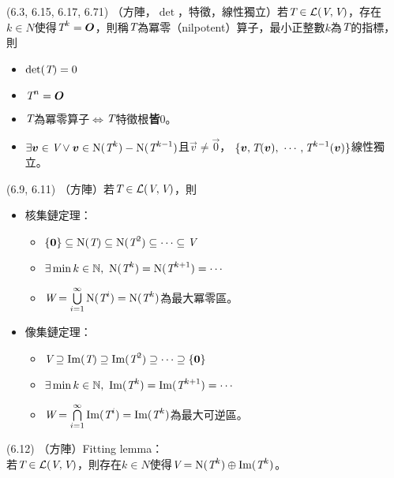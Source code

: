 \item \begin{theorem}{(6.3, 6.15, 6.17, 6.71)} （方陣，$\det$，特徵，線性獨立）若$\textit{T} \in \mathcal{L}(\textit{V}, \textit{V})$，存在$k \in N$使得$\textit{T}^{k} = \boldsymbol{O}$，則稱$\textit{T}$為冪零（nilpotent）算子，最小正整數$k$為$\textit{T}$的指標，則
	\begin{itemize}
		\item $\det(\textit{T}) = 0$
		\item $\textit{T}^n = \boldsymbol{O}$
		\item $\textit{T}$為冪零算子$\iff$$\textit{T}$特徵根\textbf{皆}$0$。
		\item $\exists \boldsymbol{v} \in \textit{V} \lor \boldsymbol{v} \in \operatorname{N}(\textit{T}^k) - \operatorname{N}(\textit{T}^{k - 1})$且$\vec{v} \neq \vec{0}$，
		$\{\boldsymbol{v}, \textit{T}(\boldsymbol{v}), \ \cdots, \textit{T}^{k - 1}(\boldsymbol{v})\}$線性獨立。
	\end{itemize}
\end{theorem}

\item \begin{theorem}{(6.9, 6.11)} （方陣）若$\textit{T} \in \mathcal{L}(\textit{V}, \textit{V})$，則
	\begin{itemize}
		\item 核集鏈定理：
			\begin{itemize}
				\item $\{\boldsymbol{0}\} \subseteq \operatorname{N}(\textit{T}) \subseteq \operatorname{N}(\textit{T}^2) \subseteq \cdots \subseteq \textit{V}$
				\item $\exists \min k \in \mathbb{N}, \ \operatorname{N}(\textit{T}^{k}) = \operatorname{N}(\textit{T}^{k + 1}) = \cdots$
				\item $\textit{W} = \bigcup\limits_{i = 1}^{\infty} \operatorname{N}(\textit{T}^i) = \operatorname{N}(\textit{T}^k)$為最大冪零區。
			\end{itemize}
		\item 像集鏈定理：
			\begin{itemize}
				\item $\textit{V} \supseteq \operatorname{Im}(\textit{T}) \supseteq \operatorname{Im}(\textit{T}^2) \supseteq \cdots \supseteq \{\boldsymbol{0}\}$
				\item $\exists \min k \in \mathbb{N}, \ \operatorname{Im}(\textit{T}^{k}) = \operatorname{Im}(\textit{T}^{k + 1}) = \cdots$
				\item $\textit{W} = \bigcap\limits_{i = 1}^{\infty} \operatorname{Im}(\textit{T}^i) = \operatorname{Im}(\textit{T}^k)$為最大可逆區。
			\end{itemize}
	\end{itemize}
\end{theorem}

\item \begin{theorem}{(6.12)} （方陣）Fitting lemma： \\
	若$\textit{T} \in \mathcal{L}(\textit{V}, \textit{V})$，則存在$k \in N$使得$\textit{V} = \operatorname{N}(\textit{T}^k) \oplus \operatorname{Im}(\textit{T}^k)$。
\end{theorem}

